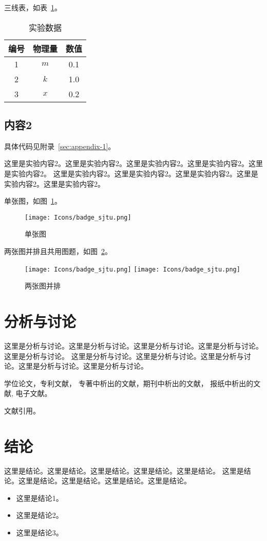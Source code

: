 三线表，如表~\ref{tab:exp-data}。

\begin{longtable}[c]{ccc}
    \caption{实验数据}
    \label{tab:exp-data} \\
    \toprule
    \textbf{编号} & \textbf{物理量} & \textbf{数值} \\
    \midrule
    \endhead
    1 & $m$ & 0.1 \\
    2 & $k$ & 1.0 \\
    3 & $x$ & 0.2 \\
    \bottomrule
\end{longtable}



\subsection{内容2}

具体代码见附录~\ref{sec:appendix-1}。

这里是实验内容2。这里是实验内容2。这里是实验内容2。这里是实验内容2。这里是实验内容2。
这里是实验内容2。这里是实验内容2。这里是实验内容2。这里是实验内容2。这里是实验内容2。

单张图，如图~\ref{fig:single-figure}。
\begin{figure}[!htp]
    \centering
    \texttt{[image: Icons/badge\_sjtu.png]}
    \caption{单张图}
    \label{fig:single-figure}
\end{figure}


两张图并排且共用图题，如图~\ref{fig:two-figures}。
\begin{figure}[!htp]
    \centering
    \texttt{[image: Icons/badge\_sjtu.png]}
    \hspace{1cm}
    \texttt{[image: Icons/badge\_sjtu.png]}
    \caption{两张图并排}
    \label{fig:two-figures}
\end{figure}


\section{分析与讨论}

这里是分析与讨论。这里是分析与讨论。这里是分析与讨论。这里是分析与讨论。这里是分析与讨论。
这里是分析与讨论。这里是分析与讨论。这里是分析与讨论。这里是分析与讨论。这里是分析与讨论。

学位论文\cite{Zhang1998}，专利文献\cite{Jiang1989,HBLZ2001}，
专著中析出的文献\cite{Cheng1999,GBT2659}，期刊中析出的文献\cite{Li1999,Li2000}，
报纸中析出的文献\cite{Ding2000}, 电子文献\cite{Jiang1999,Christine1998,Xiao2001}。

文献引用\cite{Zhang1998,Jiang1999,Christine1998,Xiao2001}。


\section{结论}

这里是结论。这里是结论。这里是结论。这里是结论。这里是结论。
这里是结论。这里是结论。这里是结论。这里是结论。这里是结论。


\begin{itemize}
    \item 这里是结论1。
    \item 这里是结论2。
    \item 这里是结论3。
\end{itemize}


\newpage
